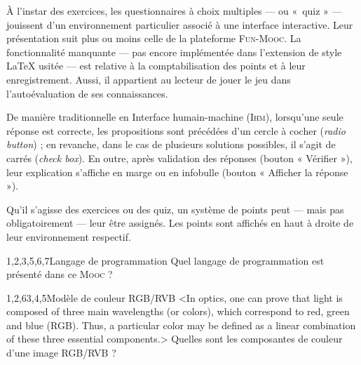 \begin{solution*}[title={Solution non moins de style}, before skip=8pt, level=intermediate, points=2 points]
\lipsum[2]
\end{solution*}


À l’instar des exercices, les questionnaires à choix multiples --- ou «~quiz » --- jouissent d'un environnement particulier associé à une interface interactive. Leur présentation suit plus ou moins celle de la plateforme \textsc{Fun-Mooc}. La fonctionnalité manquante --- pas encore implémentée dans l'extension de style \LaTeX{} usitée --- est relative à la comptabilisation des points et à leur enregistrement. Aussi, il appartient au lecteur de jouer le jeu dans l'autoévaluation de ses connaissances.

De manière traditionnelle en Interface humain-machine (\textsc{Ihm}), lorsqu'une seule réponse est correcte, les propositions sont précédées d'un cercle à cocher (\emph{radio button}) ; en revanche, dans le cas de plusieurs solutions possibles, il s'agit de carrés (\emph{check box}). En outre, après validation des réponses (bouton « Vérifier »), leur explication s'affiche en marge ou en infobulle (bouton « Afficher la réponse »).

Qu'il s'agisse des exercices ou des quiz, un système de points peut --- mais pas obligatoirement --- leur être assignés. Les points sont affichés en haut à droite de leur environnement respectif.

\vspace{6pt}

\begin{quiz*}[title=Autoévaluation, points={1,5 points}]
\vspace{-\baselineskip}
	\begin{mcqdemo*}{4}{1,2,3,5,6,7}{Langage de programmation}
		Quel langage de programmation est présenté dans ce \textsc{Mooc} ?
	\end{mcqdemo*}
	\begin{mcqdemo}{1,2,6}{3,4,5}{Modèle de couleur RGB/RVB}%
	<In optics, one can prove that light is composed of three main wavelengths (or colors), which correspond to red, green and blue (RGB). Thus, a particular color may be defined as a linear combination of these three essential components.>
		Quelles sont les composantes de couleur d'une image RGB/RVB ?
	\end{mcqdemo}
\end{quiz*}

